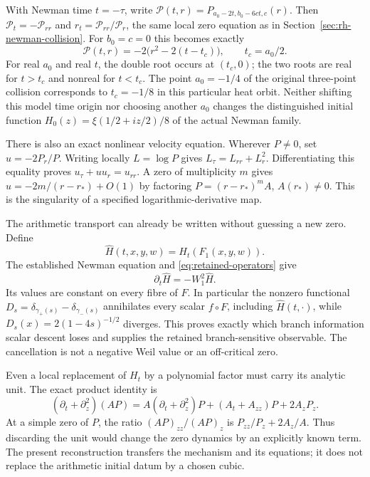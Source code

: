 With Newman time $t=-\tau$, write
$\mathcal P(t,r)=P_{a_0-2t,b_0-6ct,c}(r)$. Then
$\mathcal P_t=-\mathcal P_{rr}$ and
$r_t=\mathcal P_{rr}/\mathcal P_r$, the same local zero equation
as in Section~\ref{sec:rh-newman-collision}.
For $b_0=c=0$ this becomes exactly
\[
 \mathcal P(t,r)=-2\bigl(r^2-2(t-t_c)\bigr),\qquad t_c=a_0/2.
\]
For real $a_0$ and real $t$, the double root occurs at $(t_c,0)$;
the two roots are real for
$t>t_c$ and nonreal for $t<t_c$. The point $a_0=-1/4$ of the
original three-point collision corresponds to $t_c=-1/8$ in this
particular heat orbit. Neither shifting this model time origin nor
choosing another $a_0$ changes the distinguished initial function
$H_0(z)=\xi(1/2+iz/2)/8$ of the actual Newman family.

There is also an exact nonlinear velocity equation. Wherever $P\ne0$,
set $u=-2P_r/P$. Writing locally $L=\log P$ gives
$L_\tau=L_{rr}+L_r^2$. Differentiating this equality proves
$u_\tau+uu_r=u_{rr}$. A zero of multiplicity $m$ gives
$u=-2m/(r-r_*)+O(1)$ by factoring $P=(r-r_*)^mA$, $A(r_*)\ne0$.
This is the singularity of a specified logarithmic-derivative map.

The arithmetic transport can already be written without guessing a
new zero. Define
\[
 \widehat H(t,x,y,w)=H_t(F_1(x,y,w)).
\]
The established Newman equation and
\eqref{eq:retained-operators} give
\begin{equation}
 \partial_t\widehat H=-W_1^2\widehat H.
 \label{eq:retained-arithmetic-pullback}
\end{equation}
Its values are constant on every fibre of $F$. In particular the
nonzero functional
$D_s=\delta_{\gamma_+(s)}-\delta_{\gamma_-(s)}$ annihilates every
scalar $f\circ F$, including $\widehat H(t,\cdot)$, while
$D_s(x)=2(1-4s)^{-1/2}$ diverges. This proves exactly which branch
information scalar descent loses and supplies the retained
branch-sensitive observable. The cancellation is not a negative
Weil value or an off-critical zero.

Even a local replacement of $H_t$ by a polynomial factor must carry
its analytic unit. The exact product identity is
\begin{equation}
 (\partial_t+\partial_z^2)(AP)
 =A(\partial_t+\partial_z^2)P+(A_t+A_{zz})P+2A_zP_z.
 \label{eq:retained-unit-defect}
\end{equation}
At a simple zero of $P$, the ratio $(AP)_{zz}/(AP)_z$ is
$P_{zz}/P_z+2A_z/A$. Thus discarding the unit would change the
zero dynamics by an explicitly known term. The present reconstruction
transfers the mechanism and its equations; it does not replace the
arithmetic initial datum by a chosen cubic.

